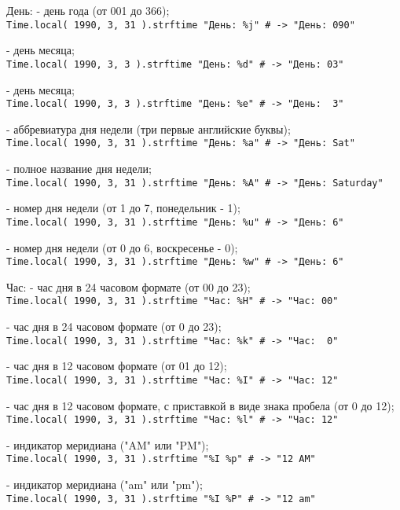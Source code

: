 \begin{keylist}{День:}
   - день года (от 001 до 366);  
  \\\verb!Time.local( 1990, 3, 31 ).strftime "День: %j" # -> "День: 090"!
   
   - день месяца;  
  \\\verb!Time.local( 1990, 3, 3 ).strftime "День: %d" # -> "День: 03"!
   
   - день месяца;  
  \\\verb!Time.local( 1990, 3, 3 ).strftime "День: %e" # -> "День:  3"!
   
   - аббревиатура дня недели (три первые английские буквы);  
  \\\verb!Time.local( 1990, 3, 31 ).strftime "День: %a" # -> "День: Sat"!
   
   - полное название дня недели;  
  \\\verb!Time.local( 1990, 3, 31 ).strftime "День: %A" # -> "День: Saturday"!
   
   - номер дня недели (от 1 до 7, понедельник - 1);  
  \\\verb!Time.local( 1990, 3, 31 ).strftime "День: %u" # -> "День: 6"!
   
   - номер дня недели (от 0 до 6, воскресенье - 0);  
  \\\verb!Time.local( 1990, 3, 31 ).strftime "День: %w" # -> "День: 6"!
\end{keylist}

\begin{keylist}{Час:}
   - час дня в 24 часовом формате (от 00 до 23);  
  \\\verb!Time.local( 1990, 3, 31 ).strftime "Час: %H" # -> "Час: 00"!    
   
   - час дня в 24 часовом формате (от 0 до 23);  
  \\\verb!Time.local( 1990, 3, 31 ).strftime "Час: %k" # -> "Час:  0"!    
   
   - час дня в 12 часовом формате (от 01 до 12);  
  \\\verb!Time.local( 1990, 3, 31 ).strftime "Час: %I" # -> "Час: 12"!    
   
   - час дня в 12 часовом формате, с приставкой в виде знака пробела (от 0 до 12);  
  \\\verb!Time.local( 1990, 3, 31 ).strftime "Час: %l" # -> "Час: 12"!    
   
   - индикатор меридиана ("AM" или "PM"); 
  \\\verb!Time.local( 1990, 3, 31 ).strftime "%I %p" # -> "12 AM"!    
   
   - индикатор меридиана ("am" или "pm");  
  \\\verb!Time.local( 1990, 3, 31 ).strftime "%I %P" # -> "12 am"!   
\end{keylist}

